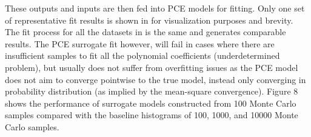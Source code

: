 \documentclass[preprint,review,12pt]{elsarticle}
\begin{document}
These outputs and inputs are then fed into PCE models for fitting. Only one set of representative fit results is shown in  for visualization purposes and brevity. The fit process for all the datasets in  is the same and generates comparable results. The PCE surrogate fit however, will fail in cases where there are insufficient samples to fit all the polynomial coefficients (underdetermined problem), but usually does not suffer from overfitting issues as the PCE model does not aim to converge pointwise to the true model, instead only converging in probability distribution (as implied by the mean-square convergence). Figure 8 shows the performance of surrogate models constructed from 100 Monte Carlo samples compared with the baseline histograms of 100, 1000, and 10000 Monte Carlo samples. 
\end{document}
